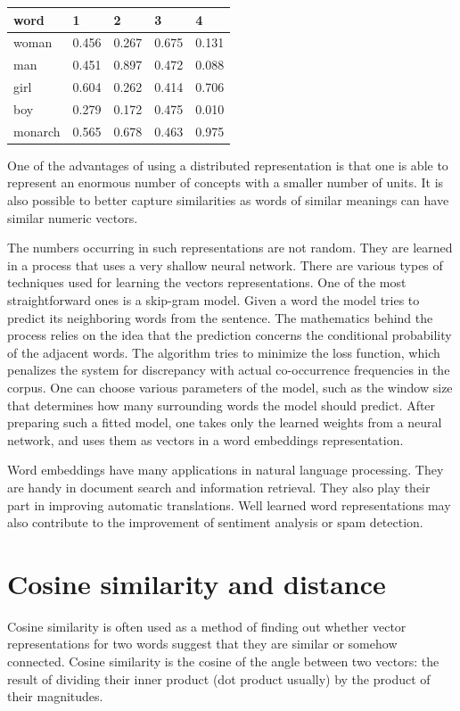 \documentclass[12pt,]{book}
\begin{document}
\begin{longtable}[]{@{}lllll@{}}
\toprule
word & 1 & 2 & 3 & 4\tabularnewline
\midrule
\endhead
woman & 0.456 & 0.267 & 0.675 & 0.131\tabularnewline
man & 0.451 & 0.897 & 0.472 & 0.088\tabularnewline
girl & 0.604 & 0.262 & 0.414 & 0.706\tabularnewline
boy & 0.279 & 0.172 & 0.475 & 0.010\tabularnewline
monarch & 0.565 & 0.678 & 0.463 & 0.975\tabularnewline
\bottomrule
\end{longtable}

One of the advantages of using a distributed representation is that one
is able to represent an enormous number of concepts with a smaller
number of units. It is also possible to better capture similarities as
words of similar meanings can have similar numeric vectors.

The numbers occurring in such representations are not random. They are
learned in a process that uses a very shallow neural network. There are
various types of techniques used for learning the vectors
representations. One of the most straightforward ones is a skip-gram
model. Given a word the model tries to predict its neighboring words
from the sentence. The mathematics behind the process relies on the idea
that the prediction concerns the conditional probability of the adjacent
words. The algorithm tries to minimize the loss function, which
penalizes the system for discrepancy with actual co-occurrence
frequencies in the corpus. One can choose various parameters of the
model, such as the window size that determines how many surrounding
words the model should predict. After preparing such a fitted model, one
takes only the learned weights from a neural network, and uses them as
vectors in a word embeddings representation.

Word embeddings have many applications in natural language processing.
They are handy in document search and information retrieval. They also
play their part in improving automatic translations. Well learned word
representations may also contribute to the improvement of sentiment
analysis or spam detection.

\section{Cosine similarity and
distance}\label{cosine-similarity-and-distance}

Cosine similarity is often used as a method of finding out whether
vector representations for two words suggest that they are similar or
somehow connected. Cosine similarity is the cosine of the angle between
two vectors: the result of dividing their inner product (dot product
usually) by the product of their magnitudes.
\end{document}
